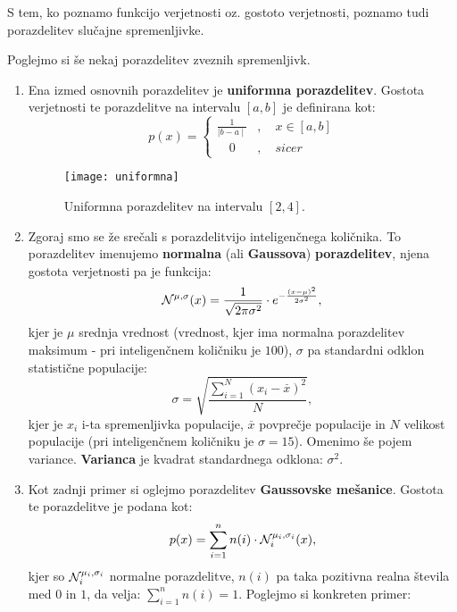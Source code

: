 S tem, ko poznamo funkcijo verjetnosti oz. gostoto verjetnosti, poznamo tudi porazdelitev slučajne spremenljivke.

Poglejmo si še nekaj porazdelitev zveznih spremenljivk.

\begin{zgled}
	\leavevmode
\begin{enumerate}
	\item {
		Ena izmed osnovnih porazdelitev je \textbf{uniformna porazdelitev}. Gostota verjetnosti te porazdelitve na intervalu $[a, b]$ je definirana kot:
		\begin{equation}
			p(x) = 
			\begin{cases}
				\frac{1}{\mid b-a \mid}&, \quad x \in [a, b] \\ 
				\quad 0&, \quad sicer
			\end{cases}
		\end{equation}
	\begin{figure}[!ht]
		\centering
		\texttt{[image: uniformna]}
		\caption{Uniformna porazdelitev na intervalu $[2, 4]$.}
	\end{figure}
		}
	\item {
		Zgoraj smo se že srečali s porazdelitvijo inteligenčnega količnika. To porazdelitev imenujemo \textbf{normalna} (ali \textbf{Gaussova}) \textbf{porazdelitev}, njena gostota verjetnosti pa je funkcija:
		\begin{equation}
			\mathcal{N}^{\mu, \sigma}(x) = \frac{1}{\sqrt{2\pi\sigma^2}}\cdot e^{-\frac{(x-\mu)^2}{2\sigma^2}},
		\end{equation}
		kjer je $\mu$ srednja vrednost (vrednost, kjer ima normalna porazdelitev maksimum - pri inteligenčnem količniku je $100$), $\sigma$ pa standardni odklon statistične populacije:
		\begin{equation}
			\sigma = \sqrt{\frac{\sum_{i=1}^N (x_i - \overset{\_}{x})^2}{N}},
		\end{equation}
		kjer je $x_i$ i-ta spremenljivka populacije, $\overset{\_}{x}$ povprečje populacije in $N$ velikost populacije (pri inteligenčnem količniku je $\sigma = 15$). Omenimo še pojem variance. \textbf{Varianca} je kvadrat standardnega odklona: $\sigma^2$.
	}
	\item {
		Kot zadnji primer si oglejmo porazdelitev \textbf{Gaussovske mešanice}. Gostota te porazdelitve je podana kot:
		\begin{equation}
			p(x) = \sum_{i=1}^n n(i) \cdot \mathcal{N}_i^{\mu_i, \sigma_i}(x),
		\end{equation}
		kjer so $\mathcal{N}_i^{\mu_i, \sigma_i}$ normalne porazdelitve, $n(i)$ pa taka pozitivna realna števila med $0$ in $1$, da velja: $\sum_{i=1}^n n(i) = 1$. Poglejmo si konkreten primer:
}
\end{enumerate}
\end{zgled}
